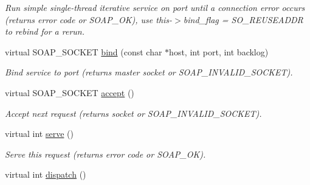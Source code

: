 \begin{DoxyCompactItemize}
\begin{DoxyCompactList}\small\item\em Run simple single-\/thread iterative service on port until a connection error occurs (returns error code or SOAP\_\-OK), use this-\/$>$bind\_\-flag = SO\_\-REUSEADDR to rebind for a rerun. \item\end{DoxyCompactList}\item 
\hypertarget{classPASSPortBindingService_a0413e1daf3ebac3ce88a9a9e3172425c}{
virtual SOAP\_\-SOCKET \hyperlink{classPASSPortBindingService_a0413e1daf3ebac3ce88a9a9e3172425c}{bind} (const char $\ast$host, int port, int backlog)}
\label{classPASSPortBindingService_a0413e1daf3ebac3ce88a9a9e3172425c}

\begin{DoxyCompactList}\small\item\em Bind service to port (returns master socket or SOAP\_\-INVALID\_\-SOCKET). \item\end{DoxyCompactList}\item 
\hypertarget{classPASSPortBindingService_a2ce4bb03be0d8da33857fbc5d94d4d5c}{
virtual SOAP\_\-SOCKET \hyperlink{classPASSPortBindingService_a2ce4bb03be0d8da33857fbc5d94d4d5c}{accept} ()}
\label{classPASSPortBindingService_a2ce4bb03be0d8da33857fbc5d94d4d5c}

\begin{DoxyCompactList}\small\item\em Accept next request (returns socket or SOAP\_\-INVALID\_\-SOCKET). \item\end{DoxyCompactList}\item 
\hypertarget{classPASSPortBindingService_a359b2e10ba55d654f92f3c314cbc1a5a}{
virtual int \hyperlink{classPASSPortBindingService_a359b2e10ba55d654f92f3c314cbc1a5a}{serve} ()}
\label{classPASSPortBindingService_a359b2e10ba55d654f92f3c314cbc1a5a}

\begin{DoxyCompactList}\small\item\em Serve this request (returns error code or SOAP\_\-OK). \item\end{DoxyCompactList}\item 
\hypertarget{classPASSPortBindingService_afb233d51ac8898c36b3961515b218d9b}{
virtual int \hyperlink{classPASSPortBindingService_afb233d51ac8898c36b3961515b218d9b}{dispatch} ()}
\label{classPASSPortBindingService_afb233d51ac8898c36b3961515b218d9b}


\end{DoxyCompactItemize}
